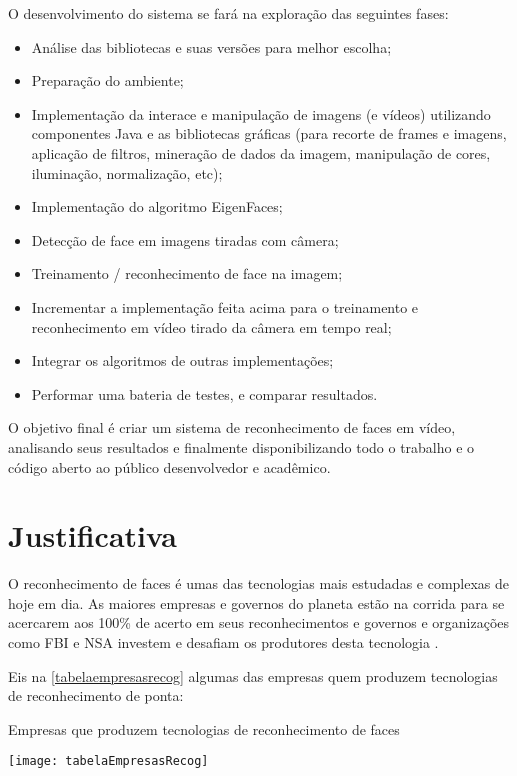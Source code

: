 O desenvolvimento do sistema se fará na exploração das seguintes fases:

\begin{itemize}
	\item Análise das bibliotecas e suas versões para melhor escolha;
	\item Preparação do ambiente;
	\item Implementação da interace e manipulação de imagens (e vídeos)  utilizando componentes Java e as bibliotecas gráficas (para  recorte de frames e imagens, aplicação de filtros, mineração de dados da imagem, manipulação de cores, iluminação, normalização, etc);
	\item Implementação do algoritmo EigenFaces;
	\item Detecção de face em imagens tiradas com câmera;
	\item Treinamento / reconhecimento de face na imagem;
	\item Incrementar a implementação feita acima para o treinamento  e reconhecimento em vídeo tirado da câmera em tempo real;
	\item Integrar os algoritmos de outras implementações;
	\item Performar uma bateria de testes, e comparar resultados.
\end{itemize}

O objetivo final é criar um sistema de reconhecimento de faces em vídeo, analisando seus resultados e finalmente disponibilizando todo o trabalho e o código aberto ao público desenvolvedor e acadêmico.


\section{Justificativa} 

O reconhecimento de faces é umas das tecnologias mais estudadas e complexas de hoje em dia. As maiores empresas e governos do planeta estão na corrida para se acercarem aos 100\% de acerto em seus reconhecimentos e governos e organizações como FBI e NSA investem e desafiam os produtores desta tecnologia \cite{nstc_homeland}.

Eis na \autoref{tabelaempresasrecog} algumas das empresas quem produzem tecnologias de reconhecimento de ponta:

\vspace*{5cm}
\begin{table}[h]
	\centering
	\caption{Empresas que produzem tecnologias de reconhecimento de faces}
	\texttt{[image: tabelaEmpresasRecog]}
	\label{tabelaempresasrecog}
\end{table}



